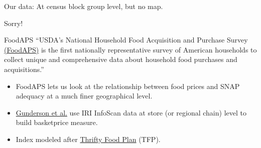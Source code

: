 \documentclass{beamer}
\begin{document}
\begin{frame}

\begin{center}\href{http://garretchristensen.shinyapps.io/Food_Price_Maps}{}

\vskip0.25in
\hrulefill

\vskip0.25in
Our data: At census block group level, but no map. 

Sorry!
\end{center}
\end{frame}

\begin{frame}{FoodAPS}
``USDA's National Household Food Acquisition and Purchase Survey \href{https://www.ers.usda.gov/data-products/foodaps-national-household-food-acquisition-and-purchase-survey.aspx}{(FoodAPS)} is the first nationally representative survey of American households to collect unique and comprehensive data about household food purchases and acquisitions.''
\begin{itemize}
\item FoodAPS lets us look at the relationship between food prices and SNAP adequacy at a much finer geographical level.
\item  \href{https://www.ers.usda.gov/media/8612/priceindexdata.pdf}{Gunderson et al.} use IRI InfoScan data at store (or regional chain) level to build basketprice measure.
\item Index modeled after \href{https://www.cnpp.usda.gov/sites/default/files/usda_food_plans_cost_of_food/TFP2006Report.pdf}{Thrifty Food Plan} (TFP). 
\end{itemize}
\end{frame}
\end{document}
